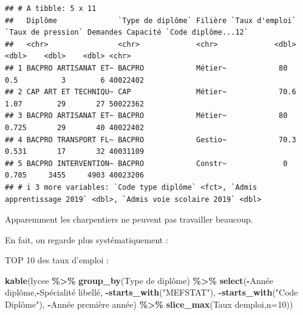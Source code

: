 \documentclass[
]{book}
\newenvironment{Shaded}{\begin{snugshade}}{\end{snugshade}}
\newcommand{\AttributeTok}[1]{\textcolor[rgb]{0.13,0.29,0.53}{#1}}
\newcommand{\DecValTok}[1]{\textcolor[rgb]{0.00,0.00,0.81}{#1}}
\newcommand{\FunctionTok}[1]{\textcolor[rgb]{0.13,0.29,0.53}{\textbf{#1}}}
\newcommand{\NormalTok}[1]{#1}
\newcommand{\SpecialCharTok}[1]{\textcolor[rgb]{0.81,0.36,0.00}{\textbf{#1}}}
\newcommand{\StringTok}[1]{\textcolor[rgb]{0.31,0.60,0.02}{#1}}
\begin{document}
\begin{verbatim}
## # A tibble: 5 x 11
##   Diplôme              `Type de diplôme` Filière `Taux d'emploi` `Taux de pression` Demandes Capacité `Code diplôme...12`
##   <chr>                <chr>             <chr>             <dbl>              <dbl>    <dbl>    <dbl> <chr>              
## 1 BACPRO ARTISANAT ET~ BACPRO            Métier~            80                0.5          3        6 40022402           
## 2 CAP ART ET TECHNIQU~ CAP               Métier~            70.6              1.07        29       27 50022362           
## 3 BACPRO ARTISANAT ET~ BACPRO            Métier~            80                0.725       29       40 40022402           
## 4 BACPRO TRANSPORT FL~ BACPRO            Gestio~            70.3              0.531       17       32 40031109           
## 5 BACPRO INTERVENTION~ BACPRO            Constr~             0                0.705     3455     4903 40023206           
## # i 3 more variables: `Code type diplôme` <fct>, `Admis apprentissage 2019` <dbl>, `Admis voie scolaire 2019` <dbl>
\end{verbatim}

Apparemment les charpentiers ne peuvent pas travailler beaucoup.

En fait, on regarde plus systématiquement :

TOP 10 des taux d'emploi :

\begin{Shaded}
\begin{Highlighting}[]
\FunctionTok{kable}\NormalTok{(lycee }\SpecialCharTok{\%\textgreater{}\%} \FunctionTok{group\_by}\NormalTok{(}\StringTok{\textasciigrave{}}\AttributeTok{Type de diplôme}\StringTok{\textasciigrave{}}\NormalTok{) }\SpecialCharTok{\%\textgreater{}\%} \FunctionTok{select}\NormalTok{(}\SpecialCharTok{{-}}\StringTok{\textasciigrave{}}\AttributeTok{Année diplôme}\StringTok{\textasciigrave{}}\NormalTok{,}\SpecialCharTok{{-}}\StringTok{\textasciigrave{}}\AttributeTok{Spécialité libellé}\StringTok{\textasciigrave{}}\NormalTok{,}
                 \SpecialCharTok{{-}}\FunctionTok{starts\_with}\NormalTok{(}\StringTok{"MEFSTAT"}\NormalTok{),}
                 \SpecialCharTok{{-}}\FunctionTok{starts\_with}\NormalTok{(}\StringTok{"Code Diplôme"}\NormalTok{),}
                 \SpecialCharTok{{-}}\StringTok{\textasciigrave{}}\AttributeTok{Année première année}\StringTok{\textasciigrave{}}\NormalTok{) }\SpecialCharTok{\%\textgreater{}\%} \FunctionTok{slice\_max}\NormalTok{(}\StringTok{\textasciigrave{}}\AttributeTok{Taux d\textquotesingle{}emploi}\StringTok{\textasciigrave{}}\NormalTok{,}\AttributeTok{n=}\DecValTok{10}\NormalTok{))}
\end{Highlighting}
\end{Shaded}
\end{document}
